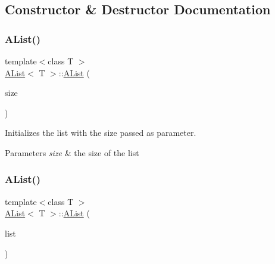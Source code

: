 \subsection{Constructor \& Destructor Documentation}
\mbox{\label{class_a_list_ab1d008b3fd27e2925f4b386ac2a40ebb}} 
\subsubsection{\texorpdfstring{AList()}{AList()}\hspace{0.1cm}{\footnotesize\ttfamily [1/3]}}
{\footnotesize\ttfamily template$<$class T $>$ \\
\mbox{\hyperlink{class_a_list}{A\+List}}$<$ T $>$\+::\mbox{\hyperlink{class_a_list}{A\+List}} (\begin{DoxyParamCaption}\item[{uint64}]{size }\end{DoxyParamCaption})\hspace{0.3cm}{\ttfamily [explicit]}}



Initializes the list with the size passed as parameter. 


\begin{DoxyParams}{Parameters}
{\em size} & the size of the list \\
\hline
\end{DoxyParams}
\mbox{\label{class_a_list_a6009559ea4861f2a9263e447485dfeb2}} 
\subsubsection{\texorpdfstring{AList()}{AList()}\hspace{0.1cm}{\footnotesize\ttfamily [2/3]}}
{\footnotesize\ttfamily template$<$class T $>$ \\
\mbox{\hyperlink{class_a_list}{A\+List}}$<$ T $>$\+::\mbox{\hyperlink{class_a_list}{A\+List}} (\begin{DoxyParamCaption}\item[{const \mbox{\hyperlink{class_a_list}{A\+List}}$<$ T $>$ \&}]{list }\end{DoxyParamCaption})}



